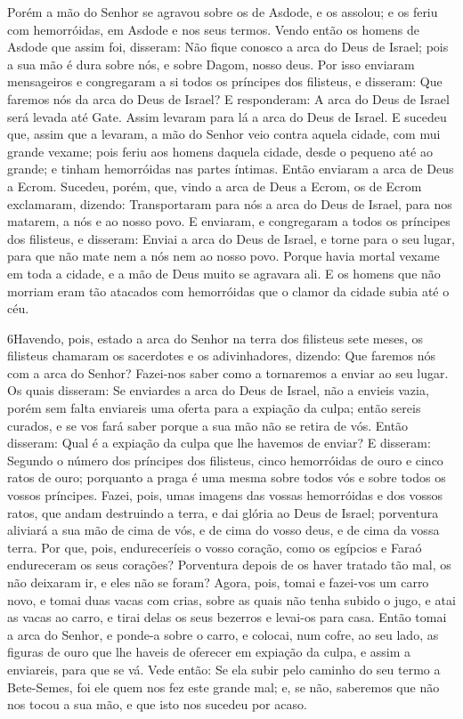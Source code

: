 Porém a mão do Senhor se agravou sobre os de Asdode, e os assolou;
e os feriu com hemorróidas, em Asdode e nos seus termos. Vendo
então os homens de Asdode que assim foi, disseram: Não fique conosco
a arca do Deus de Israel; pois a sua mão é dura sobre nós, e sobre
Dagom, nosso deus. Por isso enviaram mensageiros e congregaram a
si todos os príncipes dos filisteus, e disseram: Que faremos nós da
arca do Deus de Israel? E responderam: A arca do Deus de Israel será
levada até Gate. Assim levaram para lá a arca do Deus de Israel.
E sucedeu que, assim que a levaram, a mão do Senhor veio contra
aquela cidade, com mui grande vexame; pois feriu aos homens daquela
cidade, desde o pequeno até ao grande; e tinham hemorróidas nas
partes íntimas. Então enviaram a arca de Deus a Ecrom.
Sucedeu, porém, que, vindo a arca de Deus a Ecrom, os de Ecrom
exclamaram, dizendo: Transportaram para nós a arca do Deus de
Israel, para nos matarem, a nós e ao nosso povo. E enviaram,
e congregaram a todos os príncipes dos filisteus, e disseram: Enviai
a arca do Deus de Israel, e torne para o seu lugar, para que não
mate nem a nós nem ao nosso povo. Porque havia mortal vexame em toda
a cidade, e a mão de Deus muito se agravara ali. E os homens
que não morriam eram tão atacados com hemorróidas que o clamor da
cidade subia até o céu.

\medskip

\lettrine{6} Havendo, pois, estado a arca do Senhor na terra
dos filisteus sete meses, os filisteus chamaram os sacerdotes e
os adivinhadores, dizendo: Que faremos nós com a arca do Senhor?
Fazei-nos saber como a tornaremos a enviar ao seu lugar. Os
quais disseram: Se enviardes a arca do Deus de Israel, não a envieis
vazia, porém sem falta enviareis uma oferta para a expiação da
culpa; então sereis curados, e se vos fará saber porque a sua mão
não se retira de vós. Então disseram: Qual é a expiação da culpa
que lhe havemos de enviar? E disseram: Segundo o número dos
príncipes dos filisteus, cinco hemorróidas de ouro e cinco ratos de
ouro; porquanto a praga é uma mesma sobre todos vós e sobre todos os
vossos príncipes. Fazei, pois, umas imagens das vossas
hemorróidas e dos vossos ratos, que andam destruindo a terra, e dai
glória ao Deus de Israel; porventura aliviará a sua mão de cima de
vós, e de cima do vosso deus, e de cima da vossa terra. Por que,
pois, endureceríeis o vosso coração, como os egípcios e Faraó
endureceram os seus corações? Porventura depois de os haver tratado
tão mal, os não deixaram ir, e eles não se foram? Agora, pois,
tomai e fazei-vos um carro novo, e tomai duas vacas com crias, sobre
as quais não tenha subido o jugo, e atai as vacas ao carro, e tirai
delas os seus bezerros e levai-os para casa. Então tomai a arca
do Senhor, e ponde-a sobre o carro, e colocai, num cofre, ao seu
lado, as figuras de ouro que lhe haveis de oferecer em expiação da
culpa, e assim a enviareis, para que se vá. Vede então: Se ela
subir pelo caminho do seu termo a Bete-Semes, foi ele quem nos fez
este grande mal; e, se não, saberemos que não nos tocou a sua mão, e
que isto nos sucedeu por acaso.

